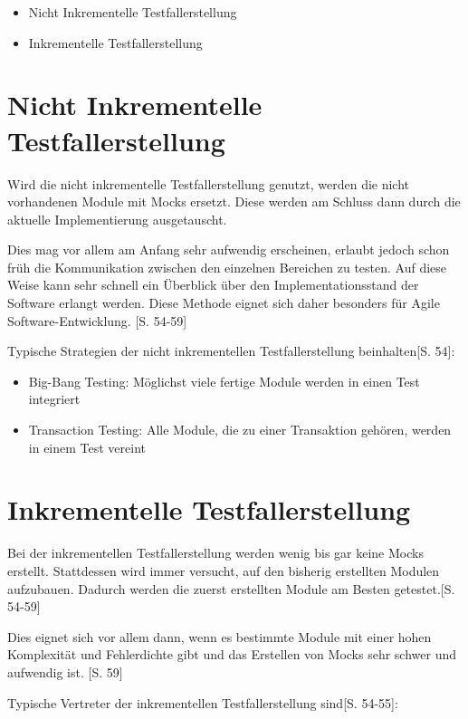 \documentclass[a4paper,bibtotoc,oneside]{scrbook}
\begin{document}
\begin{itemize}
	\item Nicht Inkrementelle Testfallerstellung
	\item Inkrementelle Testfallerstellung
\end{itemize}

\section{Nicht Inkrementelle Testfallerstellung}
Wird die nicht inkrementelle Testfallerstellung genutzt, werden die nicht vorhandenen Module mit Mocks ersetzt. Diese werden am Schluss dann durch die aktuelle Implementierung ausgetauscht.

Dies mag vor allem am Anfang sehr aufwendig erscheinen, erlaubt jedoch schon früh die Kommunikation zwischen den einzelnen Bereichen zu testen. Auf diese Weise kann sehr schnell ein Überblick über den Implementationsstand der Software erlangt werden. Diese Methode eignet sich daher besonders für Agile Software-Entwicklung. \cite{test_large_systems}[S. 54-59]

Typische Strategien der nicht inkrementellen Testfallerstellung beinhalten\cite{test_large_systems}[S. 54]:

\begin{itemize}
  \item Big-Bang Testing: Möglichst viele fertige Module werden in einen Test integriert
  \item Transaction Testing: Alle Module, die zu einer Transaktion gehören, werden in einem Test vereint
\end{itemize}


\section{Inkrementelle Testfallerstellung}
Bei der inkrementellen Testfallerstellung werden wenig bis gar keine Mocks erstellt. Stattdessen wird immer versucht, auf den bisherig erstellten Modulen aufzubauen. Dadurch werden die zuerst erstellten Module am Besten getestet.\cite{test_large_systems}[S. 54-59]

Dies eignet sich vor allem dann, wenn es bestimmte Module mit einer hohen Komplexität und Fehlerdichte gibt und das Erstellen von Mocks sehr schwer und aufwendig ist. \cite{test_large_systems}[S. 59]

Typische Vertreter der inkrementellen Testfallerstellung sind\cite{test_large_systems}[S. 54-55]:
\end{document}
